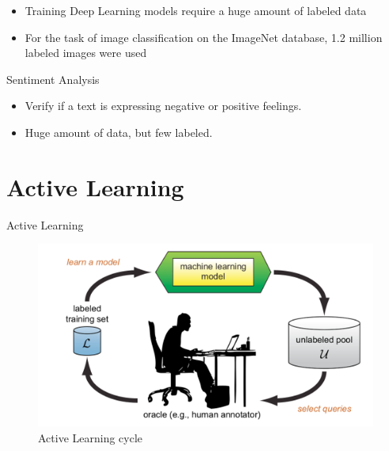 \documentclass[10pt]{beamer}
\begin{document}
\begin{frame}[fragile]
\begin{itemize}
\item Training \alert{Deep Learning} models require a huge amount of labeled data
\vspace{0.5cm}
\item For the task of image classification on the ImageNet database, 1.2 million
    labeled images were used \cite{imagenet}
\end{itemize}
\end{frame}

\begin{frame}[fragile]{Sentiment Analysis}
\begin{itemize}
\item Verify if a text is expressing negative or positive feelings.
\vspace{0.5cm}
\item Huge amount of data, but few labeled.
\end{itemize}
\end{frame}

\section{Active Learning}

\begin{frame}[fragile]{Active Learning}
    \begin{figure}[htp]
        \centering
        \includegraphics[scale=0.3]{images/active_learning.png}
        \caption{Active Learning cycle}
    \end{figure}
\end{frame}
\end{document}
